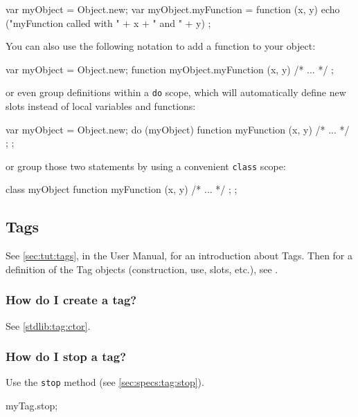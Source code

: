 \begin{urbiunchecked}
var myObject = Object.new;
var myObject.myFunction = function (x, y)
  { echo ("myFunction called with " + x + " and " + y) };
\end{urbiunchecked}

You can also use the following notation to add a function to your
object:

\begin{urbiunchecked}
var myObject = Object.new;
function myObject.myFunction (x, y) { /* ... */ };
\end{urbiunchecked}

\noindent
or even group definitions within a \lstinline{do} scope, which will
automatically define new slots instead of local variables and
functions:

\begin{urbiunchecked}
var myObject = Object.new;
do (myObject)
{
  function myFunction (x, y) { /* ... */ };
};
\end{urbiunchecked}

\noindent
or group those two statements by using a convenient \lstinline{class}
scope:

\begin{urbiunchecked}
class myObject
{
  function myFunction (x, y) { /* ... */ };
};
\end{urbiunchecked}


\subsection{Tags}

See \autoref{sec:tut:tags}, in the \us User Manual, for an
introduction about Tags.  Then for a definition of the Tag objects
(construction, use, slots, etc.), see .

\subsubsection{How do I create a tag?}
See \autoref{stdlib:tag:ctor}.

\subsubsection{How do I stop a tag?}
Use the \lstinline|stop| method (see \autoref{sec:specs:tag:stop}).
\begin{urbiunchecked}
myTag.stop;
\end{urbiunchecked}

